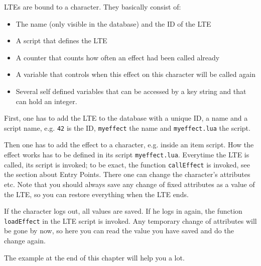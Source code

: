 \documentclass[a4paper,10pt,makeidx]{scrreprt}
\newcommand{\comm}[1]{\index{#1}\texttt{#1}}
\begin{document}
LTEs are bound to a character. They basically consist of:
\begin{itemize}
\item The name (only visible in the database) and the ID of the LTE
\item A script that defines the LTE
\item A counter that counts how often an effect had been called already
\item A variable that controls when this effect on this character will be called again
\item Several self defined variables that can be accessed by a key string and that can hold an integer.
\end{itemize}

First, one has to add the LTE to the database with a unique ID, a name and a script name, e.g. {\tt 42} is the ID, {\tt myeffect} the name and {\tt myeffect.lua} the script.

Then one has to add the effect to a character, e.g. inside an item script. How the effect works has to be defined in its script {\tt myeffect.lua}. Everytime the LTE is called, its script is invoked; to be exact, the function \comm{callEffect} is invoked, see the section about Entry Points. There one can change the character's attributes etc. Note that you should always save any change of fixed attributes as a value of the LTE, so you can restore everything when the LTE ends.

If the character logs out, all values are saved. If he logs in again, the function \comm{loadEffect} in the LTE script is invoked. Any temporary change of attributes will be gone by now, so here you can read the value you have saved and do the change again.

The example at the end of this chapter will help you a lot.
\end{document}
